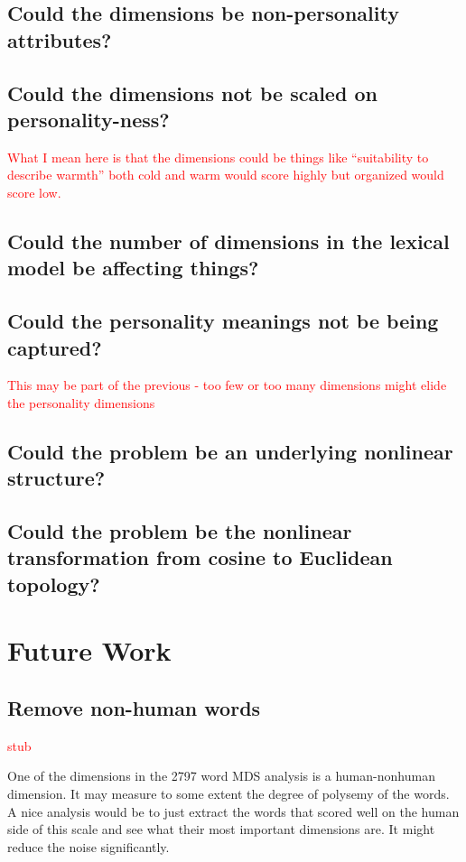 \documentclass[10pt,letterpaper]{book}
\newcommand{\todo}[1]{\textcolor{red}{#1}}
\begin{document}
\section{Could the dimensions be non-personality attributes?}
\section{Could the dimensions not be scaled on personality-ness?}

\todo{What I mean here is that the dimensions could be things like ``suitability to describe warmth'' both cold and warm would score highly but organized would score low.}

\section{Could the number of dimensions in the lexical model be affecting things?}

\section{Could the personality meanings not be being captured?}

\todo{This may be part of the previous - too few or too many dimensions might elide the personality dimensions}

\section{Could the problem be an underlying nonlinear structure?}

\section{Could the problem be the nonlinear transformation from cosine to Euclidean topology?}

\chapter{Future Work}

\section{Remove non-human words}

\todo{stub}

One of the dimensions in the 2797 word MDS analysis is a human-nonhuman 
dimension. It may measure to some extent the degree of polysemy of the words. A 
nice analysis would be to just extract the words that scored well on the human 
side of this scale and see what their most important dimensions are. It might 
reduce the noise significantly.
\end{document}

